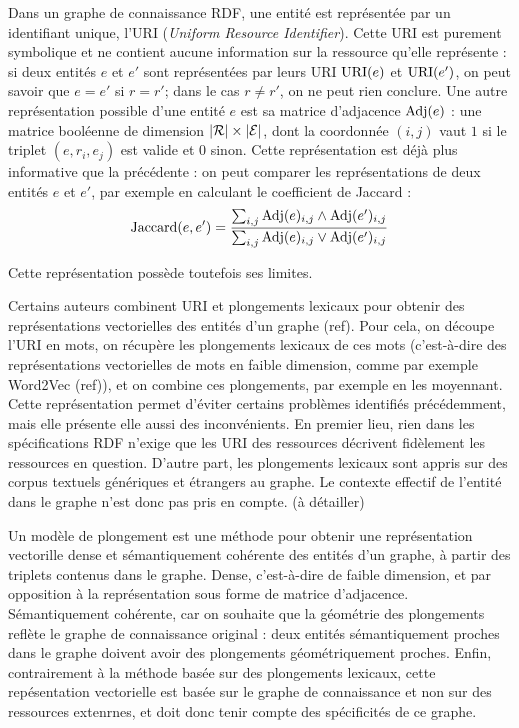 Dans un graphe de connaissance RDF, une entité est représentée par un identifiant unique, l'URI (\textit{Uniform Resource Identifier}). Cette URI est purement symbolique et ne contient aucune information sur la ressource qu'elle représente : si deux entités $e$ et $e'$ sont représentées par leurs URI $\operatorname{URI}(e)$ et $\operatorname{URI}(e')$, on peut savoir que $e = e'$ si $r=r'$; dans le cas $r \neq r'$, on ne peut rien conclure. Une autre représentation possible d'une entité $e$ est sa matrice d'adjacence $\operatorname{Adj}(e)$ : une matrice booléenne de dimension $|\mathcal{R}|\times |\mathcal{E}|$, dont la coordonnée $(i, j)$ vaut $1$ si le triplet $(e, r_i, e_j)$ est valide et $0$ sinon. Cette représentation est déjà plus informative que la précédente : on peut comparer les représentations de deux entités $e$ et $e'$, par exemple en calculant le coefficient de Jaccard :
\begin{equation}
    \operatorname{Jaccard}(e, e') = \frac{\sum_{i, j} \operatorname{Adj}(e)_{i, j} \land \operatorname{Adj}(e')_{i, j}}{\sum_{i, j} \operatorname{Adj}(e)_{i, j} \lor \operatorname{Adj}(e')_{i, j}}    
\end{equation}

Cette représentation possède toutefois ses limites. %

Certains auteurs combinent URI et plongements lexicaux pour obtenir des représentations vectorielles des entités d'un graphe (ref). Pour cela, on découpe l'URI en mots, on récupère les plongements lexicaux de ces mots (c'est-à-dire des représentations vectorielles de mots en faible dimension, comme par exemple Word2Vec (ref)), et on combine ces plongements, par exemple en les moyennant. Cette représentation permet d'éviter certains problèmes identifiés précédemment, mais elle présente elle aussi des inconvénients. En premier lieu, rien dans les spécifications RDF n'exige que les URI des ressources décrivent fidèlement les ressources en question. D'autre part, les plongements lexicaux sont appris sur des corpus textuels génériques et étrangers au graphe. Le contexte effectif de l'entité dans le graphe n'est donc pas pris en compte. (à détailler)

Un modèle de plongement est une méthode pour obtenir une représentation vectorille dense et sémantiquement cohérente des entités d'un graphe, à partir des triplets contenus dans le graphe. Dense, c'est-à-dire de faible dimension, et par opposition à la représentation sous forme de matrice d'adjacence. Sémantiquement cohérente, car on souhaite que la géométrie des plongements reflète le graphe de connaissance original : deux entités sémantiquement proches dans le graphe doivent avoir des plongements géométriquement proches. Enfin, contrairement à la méthode basée sur des plongements lexicaux, cette repésentation vectorielle est basée sur le graphe de connaissance et non sur des ressources extenrnes, et doit donc tenir compte des spécificités de ce graphe.

